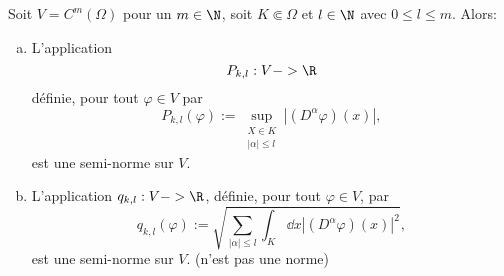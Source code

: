 \begin{proposition} %
	Soit $V=C^m(Ω)$ pour un $m\in \N$, soit $K\Subset Ω$ et $l\in \N$ avec $0≤l≤m$. Alors:
	\begin{enumerate}[(a)]
		\item L'application
		\[P_{k,l}:V->\R\]
		définie, pour tout $φ\in V$ par
		\[P_{k,l}(φ):=\sup_{\substack{X\in K\\|α|≤l}}|(D^αφ)(x)|,\]
		est une semi-norme sur $V$.
		\item L'application $q_{k,l}:V->\R$,
		définie, pour tout $φ\in V$, par
			\[q_{k,l}(φ):=\sqrt{∑_{|α|≤l}∫_K\dd{x}|(D^αφ)(x)|^2},\]
		est une semi-norme sur $V$. (n'est pas une norme)
	\end{enumerate}
\end{proposition}





